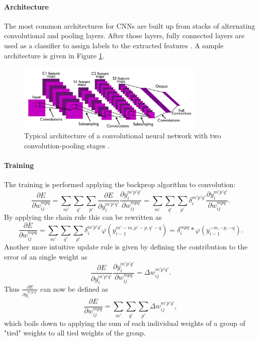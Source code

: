 \paragraph{Architecture}

The most common architectures for CNNs are built up from stacks of alternating convolutional and pooling layers. 
After those layers, fully connected layers are used as a classifier to assign labels to the extracted features \cite{NIPS2012_4824}\cite{simonyan2014very}\cite{szegedy2015going}.
A sample architecture is given in Figure \ref{fig:convarcitecuture}.

\begin{figure}[h!]
	\centering
    	\includegraphics[width=0.8\textwidth]{imgs/cnn_architecture.jpg} 
    \caption{Typical architecture of a convolutional neural network with two convolution-pooling stages \cite{cnnarchImg}.}
	\label{fig:convarcitecuture}
\end{figure}

\paragraph{Training}


The training is performed applying the backprop algorithm to convolution:
\[
\frac{\partial E}{\partial w_{ij}^{mpq}} = \sum_{m'} \sum_ {q'}  \sum_{p'} \frac{\partial E}{\partial y_i^{m' p' q'}}  \frac{\partial y_i^{m' p' q'}}{\partial w_{ij}^{mpq}}  = \sum_{m'} \sum_ {q'}  \sum_{p'} \delta_i^{m' p' q'}  \frac{\partial y_i^{m' p' q'}}{\partial w_{ij}^{mpq}}.
\] 
By applying the chain rule this can be rewritten as
\[
\frac{\partial E}{\partial w_{ij}^{mpq}} = \sum_{m'} \sum_ {q'}  \sum_{p'} \delta_i^{m' p' q'}  \varphi(y_{i-1}^{m'-m, p'-p, q'-q}) = \delta_i^{m p q}  * \varphi(y_{i-1}^{-m, -p, -q}).
\] 
Another more intuitive update rule is given by defining the contribution to the error of an single weight as
\[
\frac{\partial E}{\partial y_i^{m' p' q'}}  \frac{\partial y_i^{m' p' q'}}{\partial w_{ij}^{mpq}}  = \Delta w_{ij}^{m' p' q'}.
\] 
Thus $\frac{\partial E}{\partial y_i^{m' p' q'}}$ can now be defined as
\[
\frac{\partial E}{\partial w_{ij}^{mpq}} = \sum_{m'} \sum_ {q'}  \sum_{p'} \Delta w_{ij}^{m' p' q'},
\] 
which boils down to applying the sum of each individual weights of a group of "tied" weights to all tied weights of the group.



